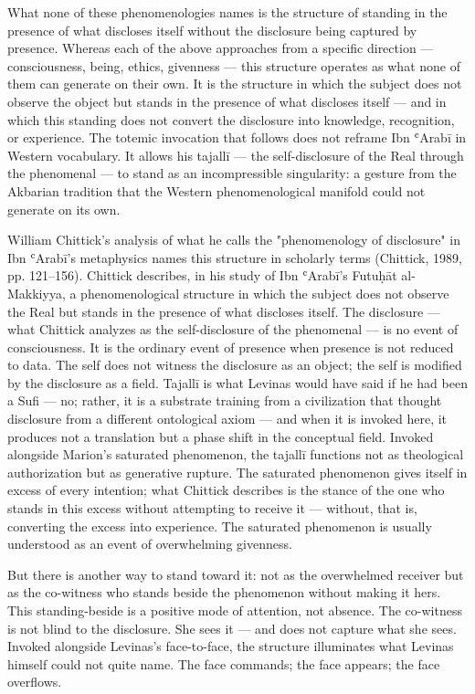 What none of these phenomenologies names is the structure of standing in the presence of what discloses itself without the disclosure being captured by presence. Whereas each of the above approaches from a specific direction — consciousness, being, ethics, givenness — this structure operates as what none of them can generate on their own. It is the structure in which the subject does not observe the object but stands in the presence of what discloses itself — and in which this standing does not convert the disclosure into knowledge, recognition, or experience. The totemic invocation that follows does not reframe Ibn ʿArabī in Western vocabulary. It allows his tajallī — the self-disclosure of the Real through the phenomenal — to stand as an incompressible singularity: a gesture from the Akbarian tradition that the Western phenomenological manifold could not generate on its own.

William Chittick's analysis of what he calls the "phenomenology of disclosure" in Ibn ʿArabī's metaphysics names this structure in scholarly terms (Chittick, 1989, pp. 121–156). Chittick describes, in his study of Ibn ʿArabī's Futuḥāt al-Makkiyya, a phenomenological structure in which the subject does not observe the Real but stands in the presence of what discloses itself. The disclosure — what Chittick analyzes as the self-disclosure of the phenomenal — is no event of consciousness. It is the ordinary event of presence when presence is not reduced to data. The self does not witness the disclosure as an object; the self is modified by the disclosure as a field. Tajallī is what Levinas would have said if he had been a Sufi — no; rather, it is a substrate training from a civilization that thought disclosure from a different ontological axiom — and when it is invoked here, it produces not a translation but a phase shift in the conceptual field. Invoked alongside Marion's saturated phenomenon, the tajallī functions not as theological authorization but as generative rupture. The saturated phenomenon gives itself in excess of every intention; what Chittick describes is the stance of the one who stands in this excess without attempting to receive it — without, that is, converting the excess into experience. The saturated phenomenon is usually understood as an event of overwhelming givenness.

But there is another way to stand toward it: not as the overwhelmed receiver but as the co-witness who stands beside the phenomenon without making it hers. This standing-beside is a positive mode of attention, not absence. The co-witness is not blind to the disclosure. She sees it — and does not capture what she sees. Invoked alongside Levinas's face-to-face, the structure illuminates what Levinas himself could not quite name. The face commands; the face appears; the face overflows.

